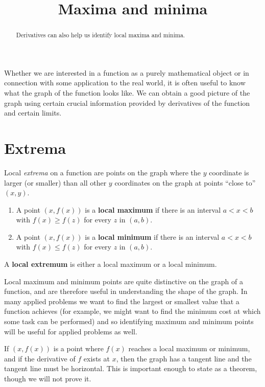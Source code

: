 \documentclass{ximera}
\title{Maxima and minima}
\begin{document}
\begin{abstract}
  Derivatives can also help us identify local maxima and minima.
\end{abstract}
\maketitle


Whether we are interested in a function as a purely mathematical
object or in connection with some application to the real world, it is
often useful to know what the graph of the function looks like. We can
obtain a good picture of the graph using certain crucial information
provided by derivatives of the function and certain limits.

\section{Extrema}

Local \textit{extrema} on a function are points on the graph where the
$y$ coordinate is larger (or smaller) than all other $y$ coordinates
on the graph at points ``close to'' $(x,y)$. 

\begin{definition}\hfil
\begin{enumerate}
\item A point $(x,f(x))$ is a \textbf{local maximum} if there is an
  interval $a<x<b$ with $f(x)\ge f(z)$ for every $z$ in $(a,b)$.
\item A point $(x,f(x))$ is a \textbf{local minimum} if
  there is an interval $a<x<b$ with $f(x)\le f(z)$ for every $z$ in
  $(a,b)$.
\end{enumerate}
A \textbf{local extremum} is either a local maximum or a local
minimum.
\end{definition}

Local maximum and minimum points are quite distinctive on the graph of
a function, and are therefore useful in understanding the shape of the
graph. In many applied problems we want to find the largest or
smallest value that a function achieves (for example, we might want
to find the minimum cost at which some task can be performed) and so
identifying maximum and minimum points will be useful for applied
problems as well.

If $(x,f(x))$ is a point where $f(x)$ reaches a local maximum or
minimum, and if the derivative of $f$ exists at $x$, then the graph
has a tangent line and the tangent line must be horizontal. This is
important enough to state as a theorem, though we will not prove it.
\end{document}
